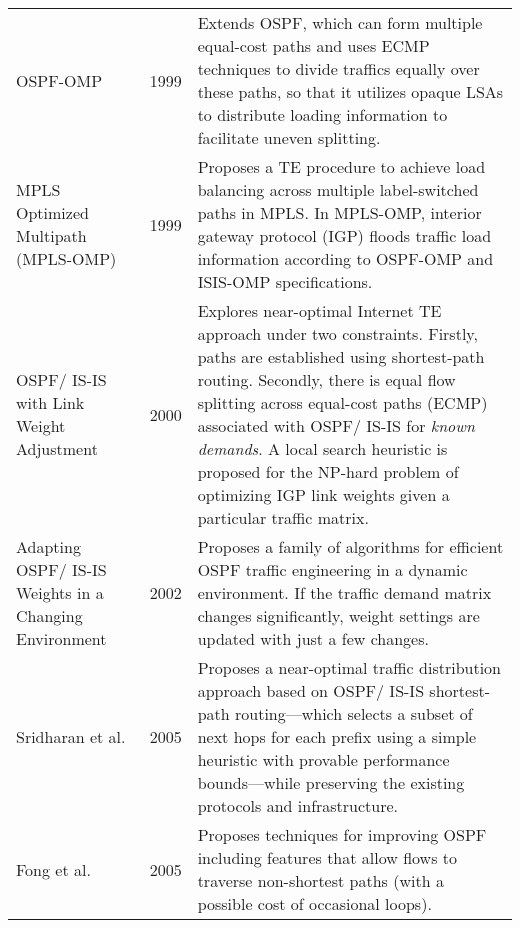 \documentclass[10pt]{IEEEtran}
\begin{document}
\begin{table*}[!ht]
\begin{tabular}{p{2.7cm}p{1cm}p{13cm}}
OSPF-OMP \cite{villamizar1999ospf} & 1999 & Extends OSPF, which can form multiple equal-cost paths and uses ECMP techniques to divide traffics equally over these paths, so that it utilizes opaque LSAs to distribute loading information to facilitate uneven splitting.\\





MPLS Optimized Multipath (MPLS-OMP) \cite{villamizar1999mpls} & 1999 & Proposes a TE procedure to achieve load balancing across multiple label-switched paths in MPLS. In MPLS-OMP, interior gateway protocol (IGP) floods traffic load information according to OSPF-OMP and ISIS-OMP specifications. \\



OSPF/ IS-IS with Link Weight Adjustment \cite{fortz2000internet} & 2000 & Explores near-optimal Internet TE approach under two constraints. Firstly, paths are established using shortest-path routing. Secondly, there is equal flow splitting across equal-cost paths (ECMP) associated with OSPF/ IS-IS for \textit{known demands}. A local search heuristic is proposed for the NP-hard problem of optimizing IGP link weights given a particular traffic matrix. \\



Adapting OSPF/ IS-IS Weights in a Changing Environment \cite{fortz2002optimizing, fortz2002traffic} & 2002 &  Proposes a family of algorithms for efficient OSPF traffic engineering in a dynamic environment. If the traffic demand matrix changes significantly, weight settings are updated with just a few changes.  \\








Sridharan et al. \cite{sridharan2005achieving} & 2005 & Proposes a near-optimal traffic distribution approach based on OSPF/ IS-IS shortest-path routing---which selects a subset of next hops for each prefix using a simple heuristic with provable performance bounds---while preserving the existing protocols and infrastructure.\\

Fong et al. \cite{fong2005better} & 2005 & Proposes techniques for improving OSPF including features that allow flows to traverse non-shortest paths (with a possible cost of occasional loops). \\


\end{tabular}
\end{table*}
\end{document}
